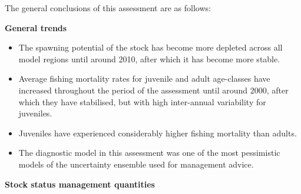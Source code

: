 \documentclass[
  english,
  a4paper,
  a4paper,
  11pt]{SCreport}
\providecommand{\DIFaddbegin}{} %
\providecommand{\DIFaddend}{} %
\newcommand{\DIFaddincludegraphics}[2][]{{\color{blue}\fbox{\DIFOincludegraphics[#1]{#2}}}} %
\DeclareRobustCommand{\DIFaddbegin}{\DIFOaddbegin \let\includegraphics\DIFaddincludegraphics} %
\DeclareRobustCommand{\DIFaddend}{\DIFOaddend \let\includegraphics\DIFOincludegraphics} %
\begin{document}
The general conclusions of this assessment are as follows:

\textbf{General trends}

\begin{itemize}
\item
  The spawning potential of the stock has become more depleted across
  all model regions until around 2010, after which it has become more
  stable.
\item
  Average fishing mortality rates for juvenile and adult age-classes
  have increased throughout the period of the assessment until around
  2000, after which they have stabilised, but with high inter-annual
  variability for juveniles.
\item
  Juveniles have experienced considerably higher fishing mortality than
  adults.
\item
  The diagnostic model in this assessment was one of the most
  pessimistic models of the uncertainty ensemble used for management
  advice.
\end{itemize}

\DIFaddbegin {}

\DIFaddend \textbf{Stock status management quantities}
\end{document}
